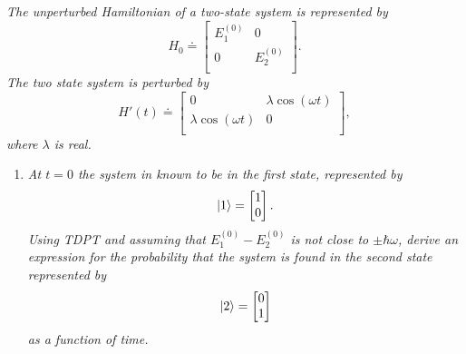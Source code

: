 \begin{example}
	\emph{The unperturbed Hamiltonian of a two-state system is represented by}
	\begin{equation}
		H_0\doteq\begin{bmatrix}
			E_1^{(0)} & 0\\
			0 & E_2^{(0)} \\ 
		\end{bmatrix}.
	\end{equation} 
	\emph{The two state system is perturbed by}
	\begin{equation}
		H'(t)\doteq\begin{bmatrix}
			0 & \lambda \cos(\omega t)\\
			\lambda \cos(\omega t) & 0 \\ 
		\end{bmatrix},
	\end{equation} 
	\emph{where $\lambda$ is real.} \newline
	
	\begin{enumerate}
		\item \emph{At $t=0$ the system in known to be in the first state, represented by}
		\begin{equation}
			\ket{1}=\begin{bmatrix}
				1\\
				0 \\ 
			\end{bmatrix}.
		\end{equation} 
		\emph{Using TDPT and assuming that $E_1^{(0)}-E_2^{(0)}$ is not close to $\pm \hbar \omega$, derive an expression for the probability that the system is found in the second state represented by}
		\begin{equation}
			\ket{2}=\begin{bmatrix}
				0\\
				1 \\ 
			\end{bmatrix}
		\end{equation} 
		\emph{as a function of time.}\newline
		

\end{enumerate}
\end{example}
